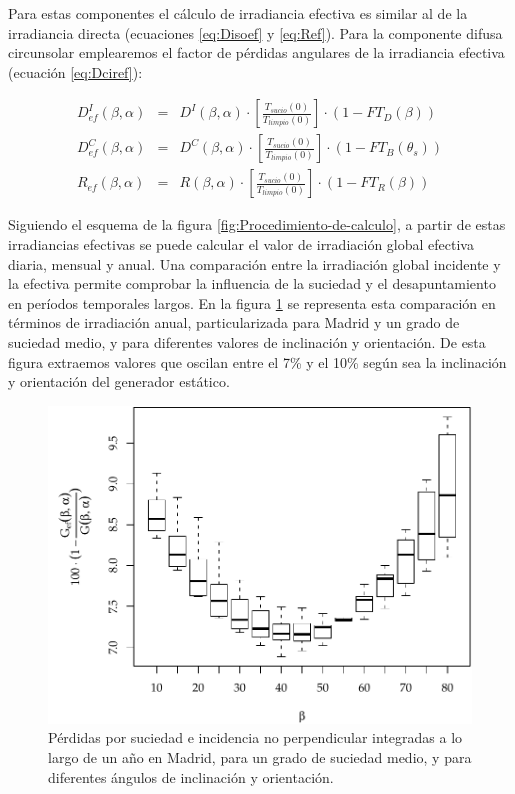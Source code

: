 Para estas componentes el cálculo de irradiancia efectiva es similar
al de la irradiancia directa (ecuaciones \ref{eq:Disoef} y \ref{eq:Ref}).
Para la componente difusa circunsolar emplearemos el factor de pérdidas
angulares de la irradiancia efectiva (ecuación \ref{eq:Dciref}):

\begin{eqnarray}
D_{ef}^{I}(\beta,\alpha) & = & D^{I}(\beta,\alpha)\cdot\left[\frac{T_{sucio}(0)}{T_{limpio}(0)}\right]\cdot(1-FT_{D}(\beta))\label{eq:Disoef}\\
D_{ef}^{C}(\beta,\alpha) & = & D^{C}(\beta,\alpha)\cdot\left[\frac{T_{sucio}(0)}{T_{limpio}(0)}\right]\cdot(1-FT_{B}(\theta_{s}))\label{eq:Dciref}\\
R_{ef}(\beta,\alpha) & = & R(\beta,\alpha)\cdot\left[\frac{T_{sucio}(0)}{T_{limpio}(0)}\right]\cdot(1-FT_{R}(\beta))\label{eq:Ref}\end{eqnarray}


Siguiendo el esquema de la figura \ref{fig:Procedimiento-de-calculo},
a partir de estas irradiancias efectivas se puede calcular el valor
de irradiación global efectiva diaria, mensual y anual. Una comparación
entre la irradiación global incidente y la efectiva permite comprobar
la influencia de la suciedad y el desapuntamiento en períodos temporales
largos. En la figura \ref{fig:PerdidasSuciedadReflexion} se representa
esta comparación en términos de irradiación anual, particularizada
para Madrid y un grado de suciedad medio, y para diferentes valores
de inclinación y orientación. De esta figura extraemos valores que
oscilan entre el 7\% y el 10\% según sea la inclinación y orientación
del generador estático.

%
\begin{figure}
\includegraphics[scale=0.75]{../figs/GefVSG}

\caption{Pérdidas por suciedad e incidencia no perpendicular integradas a lo
largo de un año en Madrid, para un grado de suciedad medio, y para
diferentes ángulos de inclinación y orientación.\label{fig:PerdidasSuciedadReflexion}}

\end{figure}
